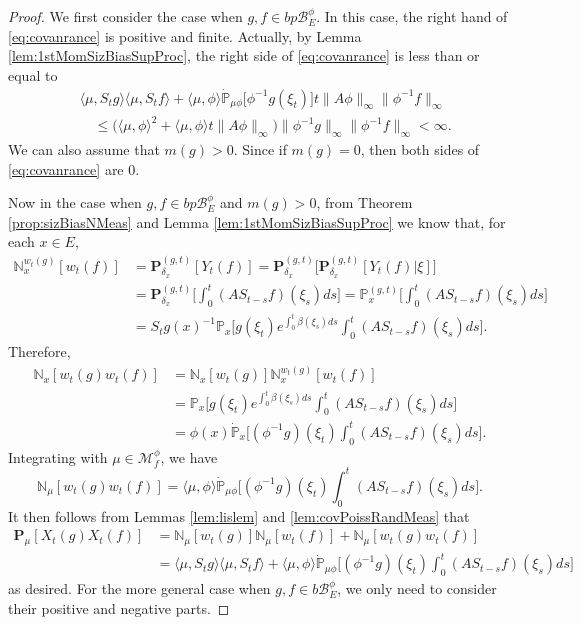 \begin{proof}
	We first consider the case when $g,f\in bp\mathscr B^\phi_E$.
	In this case, the right hand of \eqref{eq:covanrance} is positive and finite.
	Actually,
	by Lemma \ref{lem:1stMomSizBiasSupProc},
	the right side of \eqref{eq:covanrance} is less than or equal to
\[\begin{split}
	&\langle \mu, S_tg \rangle \langle\mu,S_t f \rangle + \langle \mu,\phi\rangle\dot{\mathbb P}_{\mu\phi}\big[\phi^{-1}g(\xi_t)\big] t \|A\phi\|_\infty \|\phi^{-1}f\|_\infty\\
	&\quad \leq \big(\langle \mu,\phi \rangle^2 + \langle \mu,\phi\rangle t \|A\phi\|_\infty\big)\|\phi^{-1}g\|_\infty\|\phi^{-1}f\|_\infty
	< \infty.
\end{split}\]
	We can also assume that $m(g)>0$.
	Since if $m(g)=0$,
then both sides of \eqref{eq:covanrance} are $0$.
\par
	Now in the case when $g,f\in bp\mathscr B^\phi_E$ and $m(g)>0$, from
    Theorem \ref{prop:sizBiasNMeas} and
	Lemma \ref{lem:1stMomSizBiasSupProc} we know that, for each $x\in E$,
\[\begin{split}
	\mathbb N_x^{w_t(g)}[w_t(f)]
	&= \mathbf P_{\delta_x}^{(g,t)}[Y_t(f)]
	= \mathbf P_{\delta_x}^{(g,t)} \big[\mathbf P_{\delta_x}^{(g,t)}[Y_t(f) | \xi]\big]\\
	&= \mathbf P_{\delta_x}^{(g,t)} \Big[\int_0^t  (A S_{t-s}  f)(\xi_s) ds\Big]
	= \mathbb P_x^{(g,t)} \Big[\int_0^t  (A S_{t-s} f)(\xi_s) ds\Big]\\
	&= S_t g(x)^{-1} \mathbb P_{x} \big[g(\xi_t) e^{\int_0^t \beta(\xi_s) ds} \int_0^t (A S_{t-s} f)(\xi_s) ds\big].
\end{split}\]
	Therefore,
\[\begin{split}
	\mathbb N_x[w_t(g) w_t( f)]
	&= \mathbb N_x[w_t(g)] \mathbb N_x^{w_t(g)}[w_t(f)]\\
	&= \mathbb P_x \big[g(\xi_t) e^{\int_0^t \beta(\xi_s) ds} \int_0^t( A S_{t-s} f)(\xi_s) ds\big]\\
	&= \phi(x) \dot{\mathbb P}_x \big[(\phi^{-1} g)(\xi_t) \int_0^t( A S_{t-s} f)(\xi_s)ds \big].
\end{split}\]
	Integrating with $\mu \in \mathcal M_f^{\phi}$, we have
\[
	\mathbb N_\mu[w_t(g)w_t(f)]
	= \langle\mu, \phi\rangle \dot{\mathbb P}_{\mu\phi} \big[(\phi^{-1} g)(\xi_t) \int_0^t (A S_{t-s} f)(\xi_s) ds\big].
\]
	It then follows from Lemmas \ref{lem:lislem} and \ref{lem:covPoissRandMeas} that
\[\begin{split}
	\mathbf P_\mu[ X_t( g) X_t( f)]
	&= \mathbb N_\mu[ w_t( g)] \mathbb N_\mu[ w_t( f)] + \mathbb N_\mu[ w_t( g) w_t( f)]\\
	&= \langle \mu, S_t g\rangle \langle \mu, S_t f\rangle + \langle \mu, \phi\rangle \dot{\mathbb P}_{\mu\phi} \big[ ( \phi^{-1} g)( \xi_t) \int_0^t (A S_{t-s} f)( \xi_s) ds \big]
\end{split}\]
	as desired.
	For the more general case when $g,f\in b\mathscr B^\phi_E$, we only need to consider their positive and negative parts.
\end{proof}


